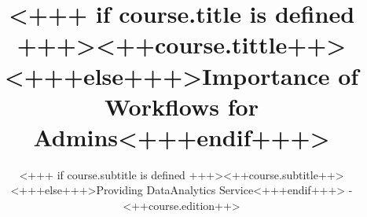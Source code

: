 \documentclass[english,xcolor=pdftex,dvipsnames]{beamer}
\title[<++course.shorttitle++>]{<+++ if course.title is defined +++><++course.tittle++><+++else+++>Importance of \Snakemake Workflows for Admins<+++endif+++>}
\subtitle{<+++ if course.subtitle is defined +++><++course.subtitle++><+++else+++>Providing DataAnalytics Service<+++endif+++> - <++course.edition++>}
\begin{document}

\sloppy

\begin{frame}[plain] %
  \titlepage
\end{frame}










      
%

%  
\end{document}
